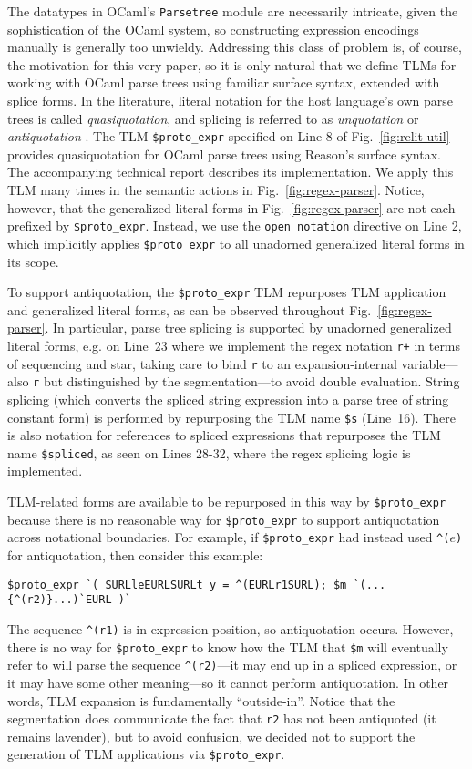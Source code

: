 \documentclass[acmsmall,screen]{acmart}
\newcommand{\li}[1]{\lstinline[basicstyle=\ttfamily\fontsize{9pt}{1em}\selectfont]{#1}}
\begin{document}
The datatypes in OCaml's \li{Parsetree} module are necessarily intricate, given the sophistication of the OCaml system, so constructing expression encodings manually is generally too unwieldy. Addressing this class of problem is, of course, the motivation for this very paper, so it is only natural that we define TLMs  for working with OCaml parse trees using familiar surface syntax, extended with splice forms. In the literature, literal notation for the host language's own parse trees is called \emph{quasiquotation}, and splicing is referred to as \emph{unquotation} or \emph{antiquotation} \cite{Bawd99a,shabalin2013quasiquotes,mainland2007s}. The TLM \li{$proto_expr}  specified on Line 8 of Fig.~\ref{fig:relit-util} provides quasiquotation for OCaml parse trees using Reason's surface syntax. The accompanying technical report describes its implementation. We apply this TLM many times in the semantic actions in Fig.~\ref{fig:regex-parser}. Notice, however, that the generalized literal forms in Fig.~\ref{fig:regex-parser} are not each prefixed by \li{$proto_expr}. Instead, we use the \li{open notation} directive on Line 2, which implicitly applies \li{$proto_expr} to all unadorned generalized literal forms in its scope. 

To support antiquotation, the \li{$proto_expr} TLM repurposes TLM application and generalized literal forms, as can be observed throughout Fig.~\ref{fig:regex-parser}. In particular, parse tree splicing is supported by unadorned generalized literal forms, e.g. on Line~23 where we implement the regex notation \li{r+} in terms of sequencing and star, taking care to bind \li{r} to an expansion-internal variable---also \li{r} but distinguished by the segmentation---to avoid double evaluation. String splicing (which converts the spliced string expression into a parse tree of string constant form) is performed by repurposing the TLM name \li{$s} (Line~16). There is also notation for references to spliced expressions that repurposes the TLM name \li{$spliced}, as seen on Lines 28-32, where the regex splicing logic is implemented. 

TLM-related forms are available to be repurposed in this way by \li{$proto_expr} because there is no reasonable way for \li{$proto_expr} to support antiquotation across notational boundaries. For example, if \li{$proto_expr} had instead used \li{^(}$e$\li{)} for antiquotation, then consider this example:
\begin{lstlisting}[numbers=none]
  $proto_expr `( SURLleEURLSURLt y = ^(EURLr1SURL); $m `(...{^(r2)}...)`EURL )`
\end{lstlisting}
The sequence \li{^(r1)} is in expression position, so antiquotation occurs. However, there is no way for \li{$proto_expr} to know how the TLM that \li{$m} will eventually refer to will parse the sequence \li{^(r2)}---it may end up in a spliced expression, or it may have some other meaning---so it cannot perform antiquotation. In other words, TLM expansion is fundamentally ``outside-in''.  Notice that the segmentation does communicate the fact that \li{r2} has not been antiquoted (it remains lavender), but to avoid confusion, we decided not to support the generation of TLM applications via \li{$proto_expr}. 
\end{document}
